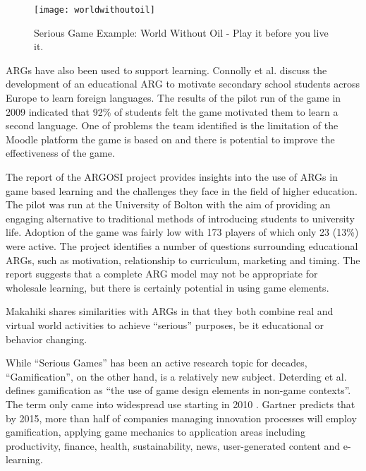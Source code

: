 \begin{figure}[ht!]
	\centering
		\texttt{[image: worldwithoutoil]}
		\caption{Serious Game Example: World Without Oil - Play it before you live it. \cite{worldwithoutoil}}
		\label{fig:worldwithoutoil}
\end{figure}

ARGs have also been used to support learning. Connolly et al. \cite{connolly2009arguing} discuss the development of an educational ARG to motivate secondary school students across Europe to learn foreign languages. The results of the pilot run of the game in 2009 indicated that 92\% of students felt the game motivated them to learn a second language. One of problems the team identified is the limitation of the Moodle \cite{moodle} platform the game is based on and there is potential to improve the effectiveness of the game.

The report of the ARGOSI project \cite{whitton2009alternate} provides insights into the use of ARGs in game based learning and the challenges they face in the field of higher education. The pilot was run at the University of Bolton with the aim of providing an engaging alternative to traditional methods of introducing students to university life. Adoption of the game was fairly low with 173 players of which only 23 (13\%) were active. The project identifies a number of questions surrounding educational ARGs, such as motivation, relationship to curriculum, marketing and timing. The report suggests that a complete ARG model may not be appropriate for wholesale learning, but there is certainly potential in using game elements.

Makahiki shares similarities with ARGs in that they both combine real and virtual world activities to achieve ``serious'' purposes, be it educational or behavior changing. 

While ``Serious Games'' has been an active research topic for decades, ``Gamification'', on the other hand, is a relatively new subject. Deterding et al. \cite {Deterding2011mt} defines gamification as ``the use of game design elements in non-game contexts''. The term only came into widespread use starting in 2010 \cite {schell2010design} \cite {zichermann2010game}. Gartner \cite {gartnerPress2011} predicts that by 2015, more than half of companies managing innovation processes will employ gamification, applying game mechanics to application areas including productivity, finance, health, sustainability, news, user-generated content and e-learning. 

